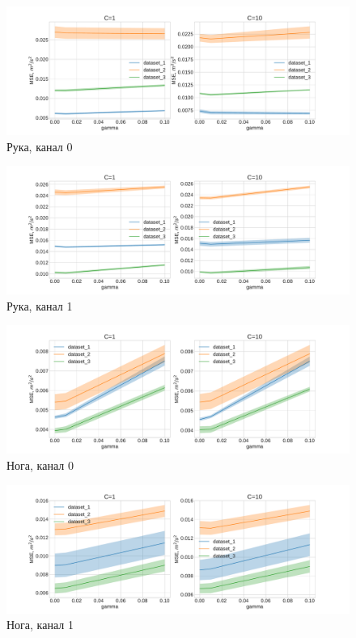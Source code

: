 \documentclass{article}
\begin{document}
    \begin{figure}[H]
    \includegraphics[scale=0.4]{charts/handheld_chn0_C=10.pdf}
    \caption{Рука, канал 0}
    \label{fig:image}
    \end{figure}
    
    \begin{figure}[H]
    \includegraphics[scale=0.4]{charts/handheld_chn1_C=10.pdf}
    \caption{Рука, канал 1}
    \label{fig:image}
    \end{figure}
    
    \begin{figure}[H]
    \includegraphics[scale=0.4]{charts/leg_chn0_C=10.pdf}
    \caption{Нога, канал 0}
    \label{fig:image}
    \end{figure}
    
    \begin{figure}[H]
    \includegraphics[scale=0.4]{charts/leg_chn1_C=10.pdf}
    \caption{Нога, канал 1}
    \label{fig:image}
    \end{figure}
    
\end{document}
